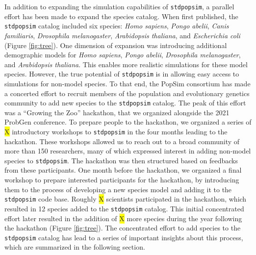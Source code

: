 \documentclass[hidelinks]{article}
\newcommand{\stdpopsim}{\texttt{stdpopsim}\xspace}
\begin{document}
In addition to expanding the simulation capabilities of \texttt{\stdpopsim}, a parallel effort has been made to expand the species catalog. When first
published, the \texttt{\stdpopsim} catalog included six species: \emph{Homo sapiens}, \emph{Pongo abelii}, \emph{Canis familiaris}, \emph{Drosophila melanogaster}, \emph{Arabidopsis thaliana}, and \emph{Escherichia coli} (Figure \ref{fig:tree}).
One dimension of expansion was introducing additional demographic models for \emph{Homo sapiens}, \emph{Pongo abelii}, \emph{Drosophila melanogaster}, and \emph{Arabidopsis thaliana}. This enables more realistic simulations for these model species. 
However, the true potential of \texttt{\stdpopsim} is in allowing easy access to simulations for non-model species. To that end, the PopSim consortium has made a concerted effort to recruit members of the population and evolutionary genetics community to add new species to the \stdpopsim catalog. The peak of this effort was a ``Growing the Zoo'' hackathon, that we organized alongside the 2021 ProbGen conference. To prepare people to the hackathon, we organized a series of \colorbox{yellow}{X} introductory workshops to \texttt{\stdpopsim} in the four months leading to the hackathon. These workshops allowed us to reach out to a broad community of more than 150 researchers, many of which expressed interest in adding non-model species to \texttt{\stdpopsim}. The hackathon was then structured based on feedbacks from these participants. One month before the hackathon, we organized a final workshop to prepare interested participants for the hackathon, by introducing them to  the process of developing a new species model and adding it to the \texttt{\stdpopsim}
code base. 
Roughly \colorbox{yellow}{X} scientists participated in the hackathon, which resulted in 12 species added to the \texttt{\stdpopsim} catalog.
This initial concentrated effort later resulted in the addition of \colorbox{yellow}{X} more species during the year following the hackathon (Figure \ref{fig:tree}).
The concentrated effort to add species to the \texttt{\stdpopsim} catalog has lead to a series of important insights about this process, which are summarized in the following section.
\end{document}
